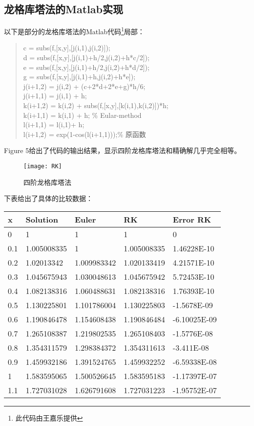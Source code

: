 \documentclass[a4paper,12pt]{article}
\begin{document}
\subsection{龙格库塔法的Matlab实现}
以下是部分的龙格库塔法的Matlab代码\footnote{此代码由王嘉乐提供}局部：

\begin{quote}
\small{    c = subs(f,[x,y],[j(i,1),j(i,2)]);\\
    d = subs(f,[x,y],[j(i,1)+h/2,j(i,2)+h*c/2]);\\
    e = subs(f,[x,y],[j(i,1)+h/2,j(i,2)+h*d/2]);\\
    g = subs(f,[x,y],[j(i,1)+h,j(i,2)+h*e]);\\
    j(i+1,2) = j(i,2) + (c+2*d+2*e+g)*h/6;\\
    j(i+1,1) = j(i,1) + h;\\
    k(i+1,2) = k(i,2) + subs(f,[x,y],[k(i,1),k(i,2)])*h;\\
    k(i+1,1) = k(i,1) + h;           \% Eular-method\\
    l(i+1,1) = l(i,1)+ h;\\
    l(i+1,2) = exp(1-cos(l(i+1,1)));\% 原函数
}
\end{quote}
Figure 5给出了代码的输出结果，显示四阶龙格库塔法和精确解几乎完全相等。\par
\begin{figure}
  \centering
  \texttt{[image: RK]}\\
  \caption{四阶龙格库塔法}
\end{figure}
下表给出了具体的比较数据：
\begin{center}
    \begin{tabular}{|l|l|l|l|l|}
  \hline
x&Solution&Euler&RK&Error RK\\
\hline
0&1&1&1&0\\
0.1&1.005008335&1&1.005008335&1.46228E-10\\
0.2&1.02013342&1.009983342&1.020133419&4.21571E-10\\
0.3&1.045675943&1.030048613&1.045675942&5.72453E-10\\
0.4&1.082138316&1.060488631&1.082138316&1.76393E-10\\
0.5&1.130225801&1.101786004&1.130225803&-1.5678E-09\\
0.6&1.190846478&1.154608438&1.190846484&-6.10025E-09\\
0.7&1.265108387&1.219802535&1.265108403&-1.5776E-08\\
0.8&1.354311579&1.298384372&1.354311613&-3.411E-08\\
0.9&1.459932186&1.391524765&1.459932252&-6.59338E-08\\
1&1.583595065&1.500526645&1.583595183&-1.17397E-07\\
1.1&1.727031028&1.626791608&1.727031223&-1.95752E-07\\
\hline
\end{tabular}
\end{center}
\end{document}
